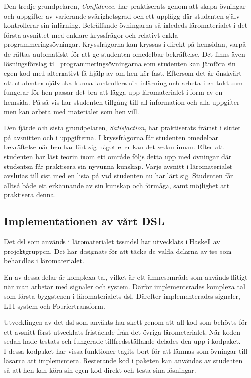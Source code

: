 \documentclass[12pt,a4paper,twoside,openright]{article}
\begin{document}
Den tredje grundpelaren, \textit{Confidence}, har praktiserats genom
att skapa övningar och uppgifter av varierande svårighetsgrad och ett
upplägg där studenten själv kontrollerar sin inlärning. Beträffande
övningarna så inlededs läromaterialet i det första avsnittet med enklare
kryssfrågor och relativt enkla programmeringsövningar. Kryssfrågorna
kan kryssas i direkt på hemsidan, varpå de rättas automatiskt för att ge
studenten omedelbar bekräftelse. Det finns även lösningsförslag till
programmeringsövningarna som studenten kan jämföra sin egen kod med alternativt
få hjälp av om hen kör fast. Eftersom det är önskvärt att studenten själv ska
kunna kontrollera sin inlärning och arbeta i en takt som fungerar för
hen passar det bra att lägga upp läromaterialet i form av en
hemsida. På så vis har studenten tillgång till all information och
alla uppgifter men kan arbeta med materialet som hen vill.

Den fjärde och sista grundpelaren, \textit{Satisfaction}, har
praktiserats främst i slutet på avsnitten och i uppgifterna. I
kryssfrågorna får studenten omedelbar bekräftelse när hen har lärt sig
något eller kan det sedan innan. Efter att studenten har läst teorin
inom ett område följs detta upp med övningar där studenten får
praktisera sin nyvunna kunskap. Varje avsnitt i läromaterialet
avslutas till sist med en lista på vad studenten nu har lärt
sig. Studenten får alltså både ett erkännande av sin kunskap och
förmåga, samt möjlighet att praktisera denna.

\subsection{Implementationen av vårt DSL}
\label{sec:implDSL}
Det \gls{dsl} som används i läromaterialet \gls{tssmdsl} har
utvecklats i Haskell av projektgruppen. Det har designats för att
täcka de valda delarna av \gls{tss} som behandlas i läromaterialet.

En av dessa delar är komplexa tal, vilket är ett ämnesområde som
används flitigt när man arbetar med signaler och system. Därför
implementerades komplexa tal som första byggstenen i läromaterialets
\gls{dsl}. Därefter implementerades signaler, LTI-system och
Fouriertransform.

Utvecklingen av det \gls{dsl} som använts har skett genom att all kod
som behövts för ett avsnitt först utvecklats fristående från det
övriga lärometerialet. När koden sedan hade testats och fungerade
tillfredsställande delades den upp i kodpaket. \\I dessa kodpaket har
vissa funktioner tagits bort för att lämnas som övningar till läsarna
att implementera. Resterande kod i paketen kan användas av studenten
så att hen kan köra sin egen kod direkt och testa sina lösningar.
\end{document}
